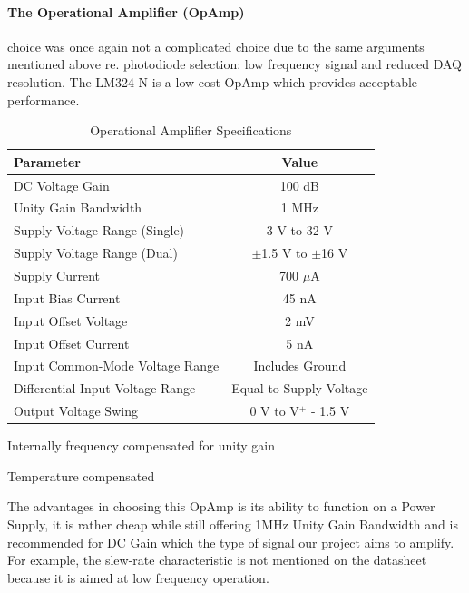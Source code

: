 \paragraph{The Operational Amplifier (OpAmp)} choice was once again not a complicated choice due to the same arguments mentioned above re. photodiode selection: low frequency signal and reduced DAQ resolution. The LM324-N is a low-cost OpAmp which provides acceptable performance. 
%
%
\begin{table}[htbp]
  \centering
  \caption{Operational Amplifier Specifications}
  \begin{tabular}{|l|c|}
  \hline
  \textbf{Parameter} & \textbf{Value} \\
  \hline
  DC Voltage Gain & 100 dB \\
  \hline
  Unity Gain Bandwidth & 1 MHz \\
  \hline
  Supply Voltage Range (Single) & 3 V to 32 V \\
  \hline
  Supply Voltage Range (Dual) & $\pm$1.5 V to $\pm$16 V \\
  \hline
  Supply Current & 700 $\mu$A \\
  \hline
  Input Bias Current & 45 nA \\
  \hline
  Input Offset Voltage & 2 mV \\
  \hline
  Input Offset Current & 5 nA \\
  \hline
  Input Common-Mode Voltage Range & Includes Ground \\
  \hline
  Differential Input Voltage Range & Equal to Supply Voltage \\
  \hline
  Output Voltage Swing & 0 V to V$^{+}$ - 1.5 V \\
  \hline
  \end{tabular}
  \begin{tablenotes}
  \small
  \item Internally frequency compensated for unity gain
  \item Temperature compensated
  \end{tablenotes}
\end{table}
The advantages in choosing this OpAmp is its ability to function on a Power Supply, it is rather cheap while still offering 1MHz Unity Gain Bandwidth and is recommended for DC Gain which the type of signal our project aims to amplify. For example, the slew-rate characteristic is not mentioned on the datasheet because it is aimed at low frequency operation.


